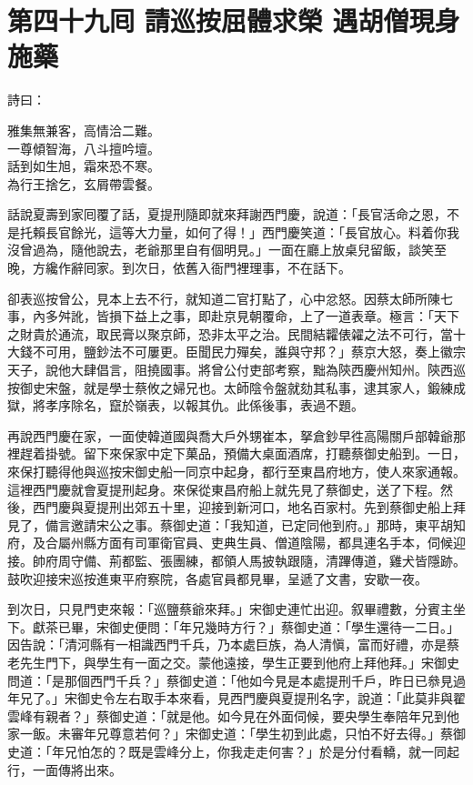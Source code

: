 
\chapter*{第四十九囘 請巡按屈體求榮 遇胡僧現身施藥}


詩曰：

\begin{myquote} 
雅集無兼客，高情洽二難。\\一尊傾智海，八斗擅吟壇。\\話到如生旭，霜來恐不寒。\\為行王捨乞，玄屑帶雲餐。
\end{myquote} 

話說夏壽到家囘覆了話，夏提刑隨即就來拜謝西門慶，說道：「長官活命之恩，不是托賴長官餘光，這等大力量，如何了得！」西門慶笑道：「長官放心。料着你我沒曾過為，隨他說去，老爺那里自有個明見。」一面在廳上放桌兒留飯，談笑至晚，方纔作辭囘家。到次日，依舊入衙門裡理事，不在話下。

卻表巡按曾公，見本上去不行，就知道二官打點了，心中忿怒。因蔡太師所陳七事，內多舛訛，皆損下益上之事，即赴京見朝覆命，上了一道表章。極言：「天下之財貴於通流，取民膏以聚京師，恐非太平之治。民間結糶俵糴之法不可行，當十大錢不可用，鹽鈔法不可屢更。臣聞民力殫矣，誰與守邦？」蔡京大怒，奏上徽宗天子，說他大肆倡言，阻撓國事。將曾公付吏部考察，黜為陝西慶州知州。陝西巡按御史宋盤，就是學士蔡攸之婦兄也。太師陰令盤就劾其私事，逮其家人，鍛練成獄，將孝序除名，竄於嶺表，以報其仇。此係後事，表過不題。

再說西門慶在家，一面使韓道國與喬大戶外甥崔本，拏倉鈔早徃高陽關戶部韓爺那裡趕着掛號。留下來保家中定下菓品，預備大桌面酒席，打聽蔡御史船到。一日，來保打聽得他與巡按宋御史船一同京中起身，都行至東昌府地方，使人來家通報。這裡西門慶就會夏提刑起身。來保從東昌府船上就先見了蔡御史，送了下程。然後，西門慶與夏提刑出郊五十里，迎接到新河口，地名百家村。先到蔡御史船上拜見了，備言邀請宋公之事。蔡御史道：「我知道，已定同他到府。」那時，東平胡知府，及合屬州縣方面有司軍衛官員、吏典生員、僧道陰陽，都具連名手本，伺候迎接。帥府周守備、荊都監、張團練，都領人馬披執跟隨，清蹕傳道，雞犬皆隱跡。鼓吹迎接宋巡按進東平府察院，各處官員都見畢，呈遞了文書，安歇一夜。

到次日，只見門吏來報：「巡鹽蔡爺來拜。」宋御史連忙出迎。叙畢禮數，分賓主坐下。獻茶已畢，宋御史便問：「年兄幾時方行？」蔡御史道：「學生還待一二日。」因告說：「清河縣有一相識西門千兵，乃本處巨族，為人清愼，富而好禮，亦是蔡老先生門下，與學生有一面之交。蒙他遠接，學生正要到他府上拜他拜。」宋御史問道：「是那個西門千兵？」蔡御史道：「他如今見是本處提刑千戶，昨日已叅見過年兄了。」宋御史令左右取手本來看，見西門慶與夏提刑名字，說道：「此莫非與翟雲峰有親者？」蔡御史道：「就是他。如今見在外面伺候，要央學生奉陪年兄到他家一飯。未審年兄尊意若何？」宋御史道：「學生初到此處，只怕不好去得。」蔡御史道：「年兄怕怎的？既是雲峰分上，你我走走何害？」{}於是分付看轎，就一同起行，一面傳將出來。

